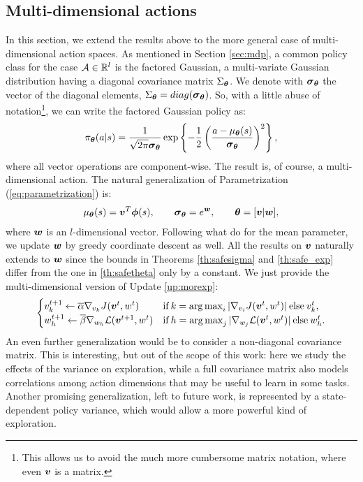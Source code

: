 \subsection{Multi-dimensional actions}\label{app:multi}
In this section, we extend the results above to the more general case of multi-dimensional action spaces.
As mentioned in Section \ref{sec:mdp}, a common policy class for the case $\Aspace\in\mathbb{R}^l$ is the factored Gaussian, \ie a multi-variate Gaussian distribution having a diagonal covariance matrix $\Sigma_{\vtheta}$. We denote with $\vsigma_{\vtheta}$ the vector of the diagonal elements, \ie $\Sigma_{\vtheta} = \mathop{diag}(\vsigma_{\vtheta})$. So, with a little abuse of notation\footnote{This allows us to avoid the much more cumbersome matrix notation, where even $\vv$ is a matrix.}, we can write the factored Gaussian policy as:
\[
\pi_{\vtheta}(a\vert s) = \frac{1}{\sqrt{2\pi}\vsigma_{\vtheta}}\exp\left\{-\frac{1}{2}\left(\frac{a - \mu_{\vtheta}(s)}{\vsigma_{\vtheta}}\right)^2\right\},
\]
where all vector operations are component-wise. The result is, of course, a multi-dimensional action. The natural generalization of Parametrization (\ref{eq:parametrization}) is:
\begin{align}\label{eq:parametrization_multi}
\mu_{\vtheta}(s)=\vv^T\vphi(s), \qquad \vsigma_{\vtheta}=e^{\vw}, \qquad \vtheta=[\vv\vert \vw],
\end{align}
where $\vw$ is an $l$-dimensional vector. Following what \cite{adaptive_batch} do for the mean parameter, we update $\vw$ by greedy coordinate descent as well. All the results on $\vv$ naturally extends to $\vw$ since the bounds in Theorems \ref{th:safesigma} and \ref{th:safe_exp} differ from the one in \ref{th:safetheta} only by a constant. We just provide the multi-dimensional version of Update \ref{up:morexp}:
\begin{align*}
\begin{cases}
v_{k}^{t+1} \gets \overline{\alpha}\gradJ[v_{k}]{\vv^t,w^t}
& \text{if}\:k =  \argmax_i |\gradJ[v_i]{\vv^t, w^t}| \:\text{else}\:v_{k}^t,\\
w_h^{t+1} \gets \overline{\beta}\nabla_{w_h}\mathcal{L}(\vv^{t+1}, w^t)
& \text{if}\:h =  \argmax_j |\nabla_{w_j}\mathcal{L}(\vv^t, w^t)| \:\text{else}\:w_{h}^t.
\end{cases}
\end{align*}
An even further generalization would be to consider a non-diagonal covariance matrix. This is interesting, but out of the scope of this work: here we study the effects of the variance on exploration, while a full covariance matrix also models correlations among action dimensions that may be useful to learn in some tasks.
Another promising generalization, left to future work, is represented by a state-dependent policy variance, which would allow a more powerful kind of exploration.



